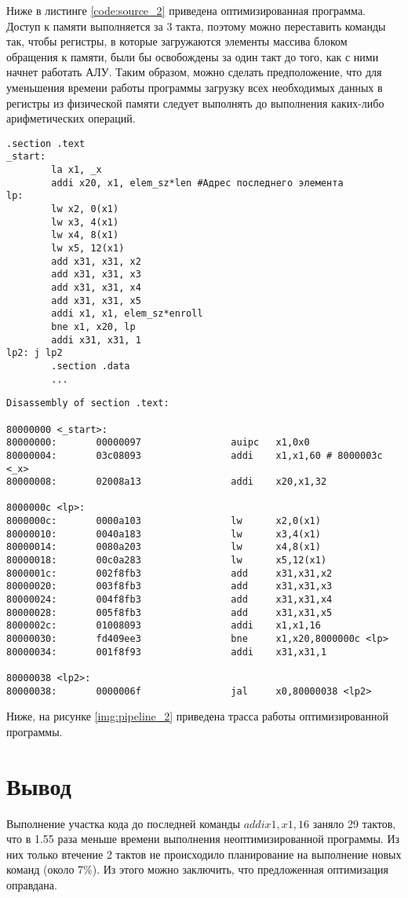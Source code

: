 Ниже в листинге \ref{code:source_2} приведена оптимизированная программа. Доступ к памяти выполняется за 3 такта, поэтому можно переставить команды так, чтобы регистры, в которые загружаются элементы массива блоком обращения к памяти, были бы освобождены за один такт до того, как с ними начнет работать АЛУ. Таким образом, можно сделать предположение, что для уменьшения времени работы программы загрузку всех необходимых данных в регистры из физической памяти следует выполнять до выполнения каких-либо арифметических операций.

\begin{lstlisting}[label=code:source_2, caption=Листинг оптимизированной программы]
		.section .text
_start:
        la x1, _x
        addi x20, x1, elem_sz*len #Адрес последнего элемента
lp:
        lw x2, 0(x1)
        lw x3, 4(x1)
        lw x4, 8(x1)
        lw x5, 12(x1)
        add x31, x31, x2
        add x31, x31, x3
        add x31, x31, x4
        add x31, x31, x5
        addi x1, x1, elem_sz*enroll
        bne x1, x20, lp
        addi x31, x31, 1
lp2: j lp2
        .section .data
        ...
\end{lstlisting}

\begin{lstlisting}[label=code:source_2, caption=Деассемблированный листинг оптимизированной  программы]
Disassembly of section .text:

80000000 <_start>:
80000000:       00000097                auipc   x1,0x0
80000004:       03c08093                addi    x1,x1,60 # 8000003c <_x>
80000008:       02008a13                addi    x20,x1,32

8000000c <lp>:
8000000c:       0000a103                lw      x2,0(x1)
80000010:       0040a183                lw      x3,4(x1)
80000014:       0080a203                lw      x4,8(x1)
80000018:       00c0a283                lw      x5,12(x1)
8000001c:       002f8fb3                add     x31,x31,x2
80000020:       003f8fb3                add     x31,x31,x3
80000024:       004f8fb3                add     x31,x31,x4
80000028:       005f8fb3                add     x31,x31,x5
8000002c:       01008093                addi    x1,x1,16
80000030:       fd409ee3                bne     x1,x20,8000000c <lp>
80000034:       001f8f93                addi    x31,x31,1

80000038 <lp2>:
80000038:       0000006f                jal     x0,80000038 <lp2>
\end{lstlisting}

Ниже, на рисунке \ref{img:pipeline_2} приведена трасса работы оптимизированной программы.


\section{Вывод}

Выполнение участка кода до последней команды $addi x1, x1, 16$ заняло 29 тактов, что в 1.55 раза меньше времени выполнения неоптимизированной программы. Из них только втечение 2 тактов не происходило планирование на выполнение новых команд (около 7\%). Из этого можно заключить, что предложенная оптимизация оправдана.